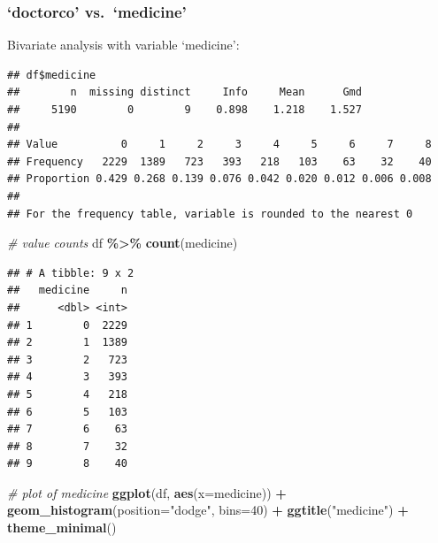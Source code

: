 \documentclass[
]{article}
\newenvironment{Shaded}{\begin{snugshade}}{\end{snugshade}}
\newcommand{\AttributeTok}[1]{\textcolor[rgb]{0.13,0.29,0.53}{#1}}
\newcommand{\CommentTok}[1]{\textcolor[rgb]{0.56,0.35,0.01}{\textit{#1}}}
\newcommand{\DecValTok}[1]{\textcolor[rgb]{0.00,0.00,0.81}{#1}}
\newcommand{\FunctionTok}[1]{\textcolor[rgb]{0.13,0.29,0.53}{\textbf{#1}}}
\newcommand{\NormalTok}[1]{#1}
\newcommand{\SpecialCharTok}[1]{\textcolor[rgb]{0.81,0.36,0.00}{\textbf{#1}}}
\newcommand{\StringTok}[1]{\textcolor[rgb]{0.31,0.60,0.02}{#1}}
\begin{document}
\subsubsection{`doctorco' vs.~`medicine'}\label{doctorco-vs.-medicine}

Bivariate analysis with variable `medicine':

\begin{Shaded}
\end{Shaded}

\begin{verbatim}
## df$medicine 
##        n  missing distinct     Info     Mean      Gmd 
##     5190        0        9    0.898    1.218    1.527 
##                                                                 
## Value          0     1     2     3     4     5     6     7     8
## Frequency   2229  1389   723   393   218   103    63    32    40
## Proportion 0.429 0.268 0.139 0.076 0.042 0.020 0.012 0.006 0.008
## 
## For the frequency table, variable is rounded to the nearest 0
\end{verbatim}

\begin{Shaded}
\begin{Highlighting}[]
\CommentTok{\# value counts}
\NormalTok{df }\SpecialCharTok{\%\textgreater{}\%} \FunctionTok{count}\NormalTok{(medicine)}
\end{Highlighting}
\end{Shaded}

\begin{verbatim}
## # A tibble: 9 x 2
##   medicine     n
##      <dbl> <int>
## 1        0  2229
## 2        1  1389
## 3        2   723
## 4        3   393
## 5        4   218
## 6        5   103
## 7        6    63
## 8        7    32
## 9        8    40
\end{verbatim}

\begin{Shaded}
\begin{Highlighting}[]
\CommentTok{\# plot of medicine}
\FunctionTok{ggplot}\NormalTok{(df, }\FunctionTok{aes}\NormalTok{(}\AttributeTok{x=}\NormalTok{medicine)) }\SpecialCharTok{+}
  \FunctionTok{geom\_histogram}\NormalTok{(}\AttributeTok{position=}\StringTok{"dodge"}\NormalTok{, }\AttributeTok{bins=}\DecValTok{40}\NormalTok{) }\SpecialCharTok{+}
  \FunctionTok{ggtitle}\NormalTok{(}\StringTok{"medicine"}\NormalTok{) }\SpecialCharTok{+}
  \FunctionTok{theme\_minimal}\NormalTok{()}
\end{Highlighting}
\end{Shaded}
\end{document}
